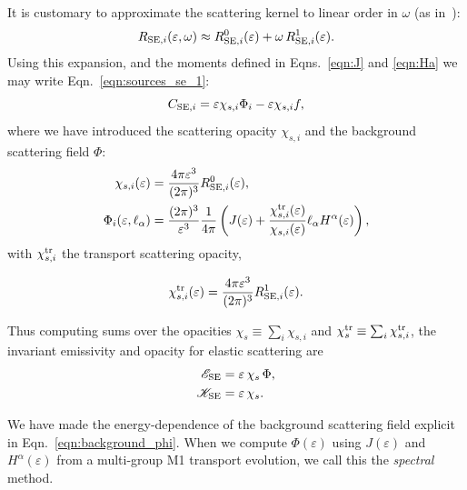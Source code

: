 \documentclass[aps,floatfix,prd,superscriptaddress,twocolumn]{revtex4-1}
\newcommand{\todo}[1]{\marginpar{\tiny{\textcolor{red}{#1}}}}
\renewcommand\todo[1]{} %
\begin{document}
It is customary to approximate the scattering kernel to linear order in
$\omega$ (as in~\cite[Eqn.~4.21]{shib2011-truncated_moment}):
\begin{equation}
  \label{eqn:se_kernel_expansion}
  R_{{\rm SE},i}(\varepsilon,\omega) \approx
  R_{{\rm SE},i}^0(\varepsilon) + \omega \, R_{{\rm SE},i}^1(\varepsilon).
\end{equation}
Using this expansion, and the moments defined in Eqns.~\ref{eqn:J}
and \ref{eqn:Ha} we may write Eqn.~\ref{eqn:sources_se_1}:
\begin{equation}
  \label{eqn:sources_se_2}
  C_{{\rm SE},i}
  = \varepsilon \chi_{s,i} \Phi_i - \varepsilon \chi_{s,i} f,
\end{equation}
where we have introduced the scattering opacity $\chi_{s,i}$
and the background scattering field $\Phi$:
\begin{align}
  \label{eqn:opacity_s}
  \chi_{s,i}(\varepsilon)
  &= \frac{4\pi\varepsilon^3}{(2\pi)^3}R_{{\rm SE},i}^0(\varepsilon), \\
  \label{eqn:background_phi}
  \Phi_i(\varepsilon,\ell_\alpha)
  &= \frac{(2\pi)^3}{\varepsilon^3}\frac{1}{4\pi}
  \left(J(\varepsilon)+
  \frac{\chi^{\rm tr}_{s,i}(\varepsilon)}{\chi_{s,i}(\varepsilon)}
  \ell_\alpha H^\alpha(\varepsilon)\right),
\end{align}
with $\chi^{\rm tr}_{s,i}$ the transport scattering opacity,
\todo{drop anisotropic term and defend}
\begin{equation}
  \label{eqn:opacity_s_tr}
  \chi^{\rm tr}_{s,i}(\varepsilon)
  = \frac{4\pi\varepsilon^3}{(2\pi)^3}R_{{\rm SE},i}^1(\varepsilon).
\end{equation}

Thus computing sums over the opacities
$\chi_s\equiv\sum_i\chi_{s,i}$ and
$\chi^{\rm tr}_s\equiv\sum_i\chi^{\rm tr}_{s,i}$,
the invariant emissivity and opacity for elastic scattering are
\begin{align}
  \label{eqn:se_emissivity_summed}
  \mathscr{E}_{\rm SE}
  &= \varepsilon \, \chi_s \, \Phi, \\
  \label{eqn:se_opacity_summed}
  \mathscr{K}_{\rm SE}
  &= \varepsilon \, \chi_s.
\end{align}

We have made the energy-dependence of the background scattering field
explicit in Eqn.~\ref{eqn:background_phi}.
When we compute $\Phi(\varepsilon)$ using $J(\varepsilon)$ and
$H^\alpha(\varepsilon)$ from a multi-group
M1 transport evolution, we call this the \emph{spectral} method.
\end{document}
